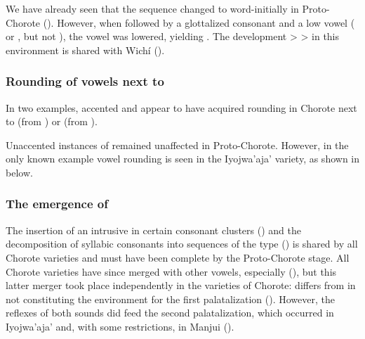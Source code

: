 We have already seen that the sequence  changed to  word-initially in Proto-Chorote (). However, when followed by a glottalized consonant and a low vowel ( or , but not ), the vowel  was lowered, yielding . The development  >  >  in this environment is shared with Wichí ().

\begin{exe}
    \ex \jaguar
    \ex \treen
    \ex \vulture
\end{exe}

\subsubsection{Rounding of vowels next to }\label{pm-ch-ekw-okw}

In two examples, accented  and  appear to have acquired rounding in Chorote next to  (from ) or  (from ).

\begin{exe}
    \ex \bite
    \ex \tornkf
\end{exe}

Unaccented instances of  remained unaffected in Proto-Chorote. However, in the only known example vowel rounding is seen in the Iyojwa’aja’ variety, as shown in  below.

\begin{exe}
    \ex \frighten
\end{exe}

\subsubsection{The emergence of }\label{pm-ch-ep-v}

The insertion of an intrusive  in certain consonant clusters () and the decomposition of syllabic consonants into sequences of the type  () is shared by all Chorote varieties and must have been complete by the Proto-Chorote stage. All Chorote varieties have since merged  with other vowels, especially  (), but this latter merger took place independently in the varieties of Chorote:  differs from  in not constituting the environment for the first palatalization (). However, the reflexes of both sounds did feed the second palatalization, which occurred in Iyojwa’aja’ and, with some restrictions, in Manjui ().

